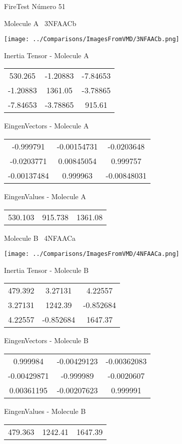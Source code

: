 \vtab[-3cm]
\begin{center}
{\large FireTest \tab Número 51}
\end{center}
\begin{multicols}{2}
\begin{center}

Molecule A \
3NFAACb

\texttt{[image: ../Comparisons/ImagesFromVMD/3NFAACb.png]}

Inertia Tensor - Molecule A \\
\begin{tabular}{|c c c|}
530.265	 & 	-1.20883	 & 	-7.84653	 \\
-1.20883	 & 	1361.05	 & 	-3.78865	 \\
-7.84653	 & 	-3.78865	 & 	915.61
\end{tabular}

\vtab
 EingenVectors - Molecule A     \\
\begin{tabular}{|c c c|}
-0.999791	 & 	-0.00154731	 & 	-0.0203648	 \\
-0.0203771	 & 	0.00845054	 & 	0.999757	 \\
-0.00137484	 & 	0.999963	 & 	-0.00848031
\end{tabular}

\vtab
 EingenValues - Molecule A     \\
\begin{tabular}{|c c c|}
530.103	 & 	915.738	 & 	1361.08	 \\
\end{tabular}
\columnbreak

Molecule B \
4NFAACa

\texttt{[image: ../Comparisons/ImagesFromVMD/4NFAACa.png]}

Inertia Tensor - Molecule B \\
\begin{tabular}{|c c c|}
479.392	 & 	3.27131	 & 	4.22557	 \\
3.27131	 & 	1242.39	 & 	-0.852684	 \\
4.22557	 & 	-0.852684	 & 	1647.37
\end{tabular}

\vtab
 EingenVectors - Molecule B     \\
\begin{tabular}{|c c c|}
0.999984	 & 	-0.00429123	 & 	-0.00362083	 \\
-0.00429871	 & 	-0.999989	 & 	-0.0020607	 \\
0.00361195	 & 	-0.00207623	 & 	0.999991
\end{tabular}

\vtab
 EingenValues - Molecule B     \\
\begin{tabular}{|c c c|}
479.363	 & 	1242.41	 & 	1647.39	 \\
\end{tabular}

\end{center}
\end{multicols}

